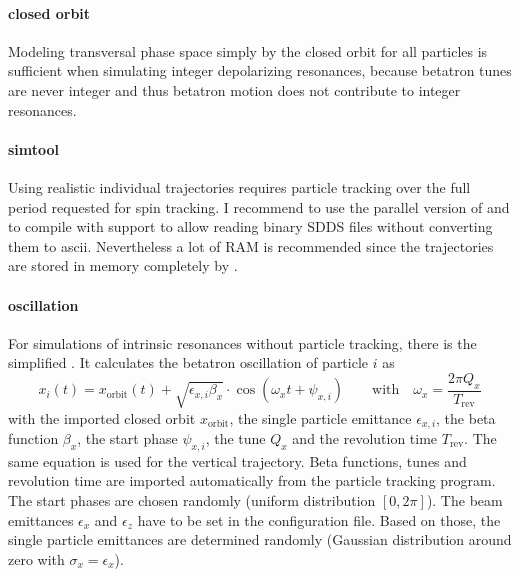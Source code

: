 \documentclass[a4paper]{scrartcl}
\begin{document}
\paragraph{closed orbit}
Modeling transversal phase space simply by the closed orbit for all particles is
sufficient when simulating integer depolarizing resonances, because betatron tunes are
never integer and thus betatron motion does not contribute to integer resonances.

\paragraph{simtool}
Using realistic individual trajectories requires particle tracking over the full period
requested for spin tracking. I recommend to use the parallel version of \ele and to
compile \pal with  support to allow \pal reading binary SDDS files without
converting them to ascii. Nevertheless a lot of RAM is recommended since the trajectories
are stored in memory completely by .

\paragraph{oscillation}
For simulations of intrinsic resonances without particle tracking, there is the simplified
 . It calculates the betatron
oscillation of particle $i$ as
\begin{equation}
  \label{eq:traj-oscillation}
  x_i(t) = x_\text{orbit}(t) + \sqrt{\epsilon_{x,i} \beta_x} \cdot \cos\left(\omega_xt + \psi_{x,i}\right)
  \qquad\text{with}\quad
  \omega_x = \frac{2\pi Q_x}{T_\text{rev}}
\end{equation}
with the imported closed orbit $x_\text{orbit}$, the single particle emittance
$\epsilon_{x,i}$, the beta function $\beta_x$, the start phase $\psi_{x,i}$, the tune
$Q_x$ and the revolution time $T_\text{rev}$. The same equation is used for the vertical
trajectory.
%
Beta functions, tunes and revolution time are imported automatically from the particle tracking
program. The start phases are chosen randomly (uniform distribution $[0,2\pi]$). The
beam emittances $\epsilon_x$ and $\epsilon_z$ have to be set in the configuration file.
Based on those, the single particle emittances are determined randomly (Gaussian
distribution around zero with $\sigma_x=\epsilon_x$).
\end{document}
